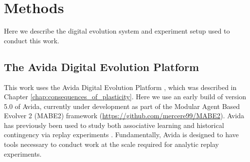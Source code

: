 \section{Methods}
Here we describe the digital evolution system and experiment setup used to conduct this work.

\subsection{The Avida Digital Evolution Platform}
\label{sub-evo-software}

This work uses the Avida Digital Evolution Platform \citep{ofriaAvidaSoftwarePlatform2004a}, which was described in Chapter \ref{chap:consequences_of_plasticity}.
Here we use an early build of version 5.0 of Avida, currently under development as part of the Modular Agent Based Evolver 2 (MABE2) framework (\href{https://github.com/mercere99/MABE2}{https://github.com/mercere99/MABE2}).
Avida has previously been used to study both associative learning \citep{pontesEvolutionaryOriginAssociative2020, grabowskiEarlyEvolutionMemory2010a} and historical contingency via replay experiments \citep{yedidHistoricalContingentFactors2008, covertiiiExperimentsRoleDeleterious2013}.
Fundamentally, Avida is designed to have tools necessary to conduct work at the scale required for analytic replay experiments. 

